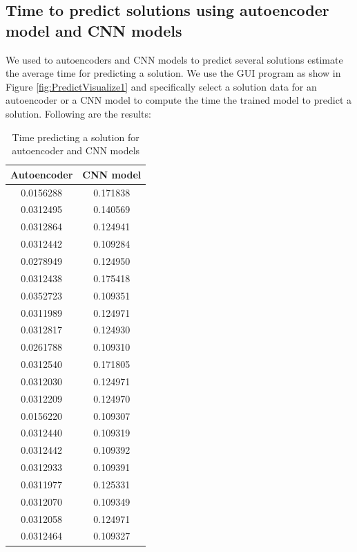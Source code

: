 \documentclass{article}
\begin{document}
\subsection{Time to predict solutions using autoencoder model and CNN models}
We used to autoencoders and CNN models to predict several solutions estimate the average time for predicting a solution. We use the GUI program as show in Figure \ref{fig:PredictVisualize1} and specifically select a solution data for an autoencoder or a CNN model to compute the time the trained model to predict a solution.  Following are the results:
\begin{table} [h!]
	\centering
	\begin{tabular}{c|c}
		Autoencoder & CNN model \\
		\hline
		0.0156288 & 0.171838 \\
		\hline
		0.0312495 & 0.140569 \\
		\hline 
		0.0312864 & 0.124941 \\
		\hline
		0.0312442 & 0.109284 \\
		\hline
		0.0278949 & 0.124950 \\
		\hline
		0.0312438 & 0.175418 \\
		\hline
		0.0352723 & 0.109351 \\
		\hline
		0.0311989 & 0.124971 \\
		\hline
		0.0312817 & 0.124930 \\
		\hline
		0.0261788 & 0.109310 \\
		\hline
		0.0312540 & 0.171805 \\
		\hline
		0.0312030 & 0.124971 \\
		\hline
		0.0312209 & 0.124970 \\
		\hline
		0.0156220 & 0.109307 \\ 
		\hline
		0.0312440 & 0.109319 \\
		\hline
		0.0312442 & 0.109392 \\
		\hline
		0.0312933 & 0.109391 \\
		\hline
		0.0311977 & 0.125331 \\
		\hline
		0.0312070 & 0.109349 \\
		\hline
		0.0312058 & 0.124971 \\
		\hline
		0.0312464 & 0.109327 \\
		\hline
	\end{tabular}
	\caption{Time predicting a solution for autoencoder and CNN models }
	\label{table:time}
\end{table}
\end{document}
